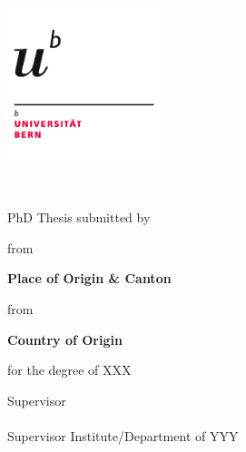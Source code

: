 \documentclass[
10pt, %
english, %
singlespacing, %
headsepline, %
]{MastersDoctoralThesis} %
\author{\textsc{Surname} FirstName} %
\begin{document}
\frontmatter %

\pagestyle{plain} %


\begin{titlepage}

\hfill{\includegraphics[width=4.5cm]{Logo-unibe}}

\begin{center}

\vspace*{0.5cm}
{\Large \facname \\ \textsc{\univname} \par}\vspace{1cm} %

{\huge \bfseries \ttitle\par}\vspace{1cm} %
\large{PhD Thesis submitted by}\vspace{0.5cm}

{\Large \bfseries \authorname \par}\vspace{0.5cm}

\large{from }{\Large \bfseries Place of Origin \& Canton \par}\vspace{0.5cm}

\large{from }{\Large \bfseries Country of Origin \par}\vspace{0.5cm}

\large{for the degree of XXX}\vspace{0.5cm}
 
\vfill

\large{Supervisor \\ \supname \\ Supervisor Institute/Department of YYY}\vspace{0.5cm}


\end{center}
\end{titlepage}
\end{document}
